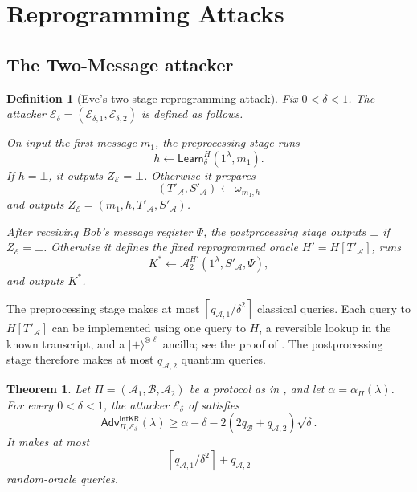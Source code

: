 \documentclass[11pt]{article}
\newtheorem{theorem}{Theorem}[section]
\newtheorem{definition}[definition]{Definition}
\newcommand{\cA}{\mathcal{A}}
\newcommand{\cB}{\mathcal{B}}
\newcommand{\cE}{\mathcal{E}}
\newcommand{\Learn}{\mathsf{Learn}}
\newcommand{\IntKR}{\mathsf{IntKR}}
\newcommand{\Adv}{\mathsf{Adv}}
\newcommand{\ket}[1]{\lvert #1\rangle}
\newcommand{\ceil}[1]{\left\lceil #1\right\rceil}
\begin{document}
\section{Reprogramming Attacks}\label{sec:main-attack}

\subsection{The Two-Message attacker}

\begin{definition}[Eve's two-stage reprogramming attack]\label{def:eve}
Fix \(0<\delta<1\).  The attacker
\(\cE_\delta=(\cE_{\delta,1},
\cE_{\delta,2})\) is defined as follows.

On input the first message \(m_1\), the preprocessing stage runs
\[
  h\leftarrow\Learn_\delta^H(1^\lambda,m_1).
\]
If \(h=\bot\), it outputs \(Z_{\cE}=\bot\).  Otherwise it prepares
\[
  (T'_{\cA},S'_{\cA})\leftarrow\omega_{m_1,h}
\]
and outputs \(Z_{\cE}=(m_1,h,T'_{\cA},S'_{\cA})\).

After receiving Bob's message register \(\Psi\), the postprocessing stage
outputs \(\bot\) if \(Z_{\cE}=\bot\).  Otherwise it defines the fixed
reprogrammed oracle \(H'=H[T'_{\cA}]\), runs
\[
  K^*\leftarrow
  \cA_2^{H'}(1^\lambda,S'_{\cA},\Psi),
\]
and outputs \(K^*\).
\end{definition}

The preprocessing stage makes at most
\(\ceil{q_{\cA,1}/\delta^2}\) classical queries. Each query to
\(H[T'_{\cA}]\) can be implemented using one query to \(H\), a reversible
lookup in the known transcript, and a \(\ket{+}^{\otimes\ell}\) ancilla; see
the proof of . The postprocessing stage therefore makes at
most \(q_{\cA,2}\) quantum queries.

\begin{theorem}\label{thm:main}
Let \(\Pi=(\cA_1,\cB,\cA_2)\) be a protocol as in
, and let
\(\alpha=\alpha_\Pi(\lambda)\).  For every \(0<\delta<1\), the attacker
\(\cE_\delta\) of  satisfies
\[
  \Adv^{\IntKR}_{\Pi,\cE_\delta}(\lambda)
  \ge
  \alpha
  -\delta
  -2(2q_{\cB}+q_{\cA,2})\sqrt\delta.
\]
It makes at most
\[
  \ceil{q_{\cA,1}/\delta^2}+q_{\cA,2}
\]
random-oracle queries.
\end{theorem}
\end{document}
